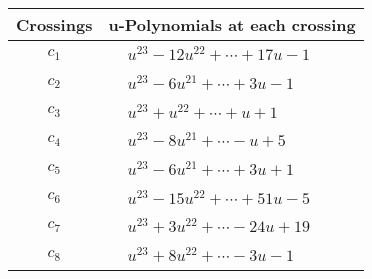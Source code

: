 \documentclass[1p]{elsarticle_modified}
\theoremstyle{definition}
\begin{document}
\begin{tabular}{m{50pt}|m{274pt}}
Crossings & \hspace{64pt}u-Polynomials at each crossing \\
\hline $$\begin{aligned}c_{1}\end{aligned}$$&$\begin{aligned}
&u^{23}-12 u^{22}+\cdots+17 u-1
\end{aligned}$\\
\hline $$\begin{aligned}c_{2}\end{aligned}$$&$\begin{aligned}
&u^{23}-6 u^{21}+\cdots+3 u-1
\end{aligned}$\\
\hline $$\begin{aligned}c_{3}\end{aligned}$$&$\begin{aligned}
&u^{23}+u^{22}+\cdots+u+1
\end{aligned}$\\
\hline $$\begin{aligned}c_{4}\end{aligned}$$&$\begin{aligned}
&u^{23}-8 u^{21}+\cdots- u+5
\end{aligned}$\\
\hline $$\begin{aligned}c_{5}\end{aligned}$$&$\begin{aligned}
&u^{23}-6 u^{21}+\cdots+3 u+1
\end{aligned}$\\
\hline $$\begin{aligned}c_{6}\end{aligned}$$&$\begin{aligned}
&u^{23}-15 u^{22}+\cdots+51 u-5
\end{aligned}$\\
\hline $$\begin{aligned}c_{7}\end{aligned}$$&$\begin{aligned}
&u^{23}+3 u^{22}+\cdots-24 u+19
\end{aligned}$\\
\hline $$\begin{aligned}c_{8}\end{aligned}$$&$\begin{aligned}
&u^{23}+8 u^{22}+\cdots-3 u-1
\end{aligned}$\\

\end{tabular}
\end{document}
